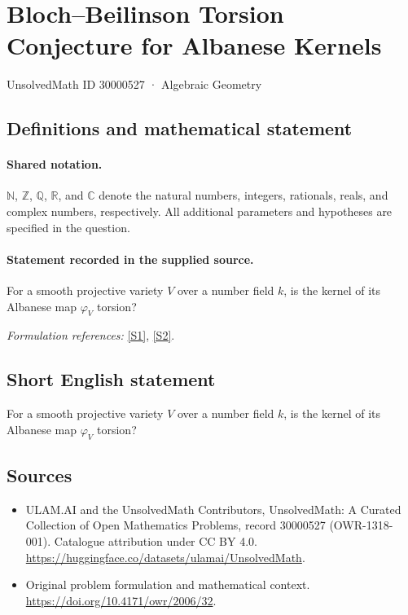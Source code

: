 \documentclass[11pt]{article}
\newcommand{\sref}[2]{\hyperlink{source:#1:#2}{[S#2]}}
\begin{document}
\setcounter{section}{30000526}
\section{Bloch–Beilinson Torsion Conjecture for Albanese Kernels}\label{30000527}
{\small UnsolvedMath ID 30000527 · Algebraic Geometry}
\subsection{Definitions and mathematical statement}

\paragraph{Shared notation.}$\mathbb N$, $\mathbb Z$, $\mathbb Q$, $\mathbb R$, and $\mathbb C$ denote the natural numbers, integers, rationals, reals, and complex numbers, respectively. All additional parameters and hypotheses are specified in the question.


\paragraph{Statement recorded in the supplied source.}
For a smooth projective variety $V$ over a number field $k$, is the kernel of its Albanese map $\varphi_V$ torsion?
\par\smallskip\textit{Formulation references:} \sref{30000527}{1}, \sref{30000527}{2}.
\subsection{Short English statement}
For a smooth projective variety $V$ over a number field $k$, is the kernel of its Albanese map $\varphi_V$ torsion?
\subsection{Sources}
\begin{itemize}
\item[\hypertarget{source:30000527:1}{S1}] ULAM.AI and the UnsolvedMath Contributors, UnsolvedMath: A Curated Collection of Open Mathematics Problems, record 30000527 (OWR-1318-001). Catalogue attribution under CC BY 4.0.
\url{https://huggingface.co/datasets/ulamai/UnsolvedMath}.
\item[\hypertarget{source:30000527:2}{S2}] Original problem formulation and mathematical context.
\url{https://doi.org/10.4171/owr/2006/32}.
\end{itemize}
\label{end:30000527}
\end{document}
